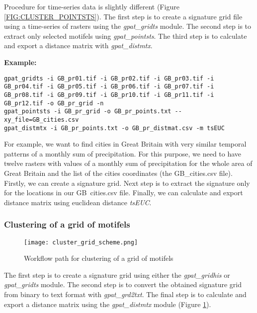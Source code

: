 Procedure for time-series data is slightly different (Figure \ref{FIG:CLUSTER_POINTSTS}).
The first step is to create a signature grid file using a time-series of rasters using the {\it gpat\_gridts} module.
The second step is to extract only selected motifels using {\it gpat\_pointsts}.
The third step is to calculate and export a distance matrix with {\it gpat\_distmtx}.

{\bf Example:}

\begin{minipage}{\linewidth}
\begin{lstlisting}
gpat_gridts -i GB_pr01.tif -i GB_pr02.tif -i GB_pr03.tif -i GB_pr04.tif -i GB_pr05.tif -i GB_pr06.tif -i GB_pr07.tif -i GB_pr08.tif -i GB_pr09.tif -i GB_pr10.tif -i GB_pr11.tif -i GB_pr12.tif -o GB_pr_grid -n
gpat_pointsts -i GB_pr_grid -o GB_pr_points.txt --xy_file=GB_cities.csv
gpat_distmtx -i GB_pr_points.txt -o GB_pr_distmat.csv -m tsEUC 
\end{lstlisting}
\end{minipage}

For example, we want to find cities in Great Britain with very similar temporal patterns of a monthly sum of precipitation. 
For this purpose, we need to have twelve rasters with values of a monthly sum of precipitation for the whole area of Great Britain and the list of the cities coordinates (the GB\_cities.csv file).
Firstly, we can create a signature grid. 
Next step is to extract the signature only for the locations in our GB\ cities.csv file.
Finally, we can calculate and export distance matrix using euclidean distance {\it tsEUC}.

\FloatBarrier

\subsubsection{Clustering of a grid of motifels}

\begin{figure}[H]
	\centering
	\texttt{[image: cluster\_grid\_scheme.png]}
	\caption{Workflow path for clustering of a grid of motifels}
	\label{FIG:CLUSTER_GRID}
\end{figure}

The first step is to create a signature grid using either the {\it gpat\_gridhis} or {\it gpat\_gridts} module.
The second step is to convert the obtained signature grid from binary to text format with {\it gpat\_grd2txt}.
The final step is to calculate and export a distance matrix using the {\it gpat\_distmtx} module (Figure \ref{FIG:CLUSTER_GRID}).

